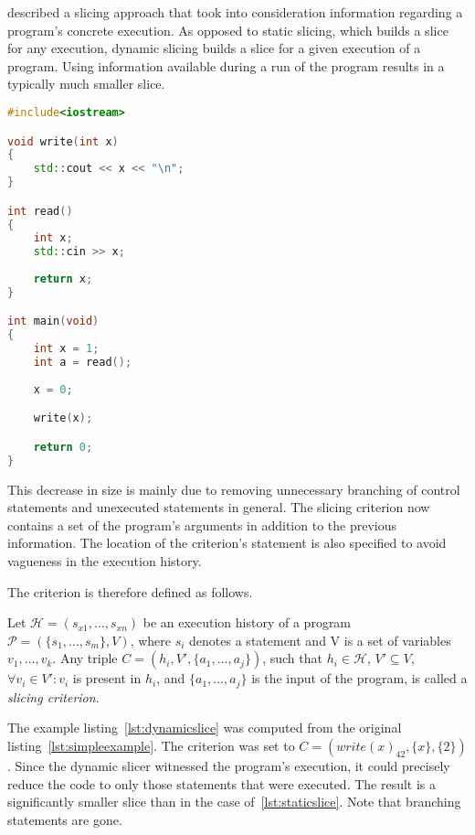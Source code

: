 \citet{Korel88} described a slicing approach that took into 
consideration information regarding a program's concrete execution. 
As opposed to static slicing, which builds a slice for any execution, 
dynamic slicing builds a slice for a given execution of a program. 
Using information available during a run of the program 
results in a typically much smaller slice.

\begin{lstlisting}[caption=Dynamic slice of the simple
  branching program., language=C++, label={lst:dynamicslice}]
#include<iostream>

void write(int x)
{
	std::cout << x << "\n";
}

int read()
{
	int x;
	std::cin >> x;
	
	return x;
}

int main(void)
{
	int x = 1;
	int a = read();
		
	x = 0;

	write(x);

	return 0;
}  
\end{lstlisting}

This decrease in size is mainly due to removing unnecessary 
branching of control statements and unexecuted statements in general. 
The slicing criterion now contains a set of the program's 
arguments in addition to the previous information. 
The location of the criterion's statement is also specified to avoid 
vagueness in the execution history. 

The criterion is therefore defined as follows.

\begin{defn}\label{def02:6}
  Let $\mathcal{H} = (s_{x1},\dots,s_{xn})$ be an execution history of a program 
  $\mathcal{P} = (\{s_1,\dots,s_m\}, V)$, where $s_i$ denotes a statement
  and V is a set of variables $v_1,\dots,v_k$.
  Any triple $C = (h_i, V', \{a_1,\dots,a_j\})$, such that $h_i \in \mathcal{H}$,
  $V' \subseteq V$, $\forall v_i \in V': v_i$ is present in $h_i$,
  and $\{a_1,\dots,a_j\}$ is the input of the program,
  is called a \emph{slicing criterion}.
\end{defn}

The example listing~\ref{lst:dynamicslice} was computed from the original
listing~\ref{lst:simpleexample}. 
The criterion was set to $C = (write(x)_{42}, \{x\}, \{2\})$.
Since the dynamic slicer witnessed the program's execution,
it could precisely reduce the code to only those statements
that were executed. The result is a significantly smaller slice
than in the case of~\ref{lst:staticslice}.
Note that branching statements are gone.

